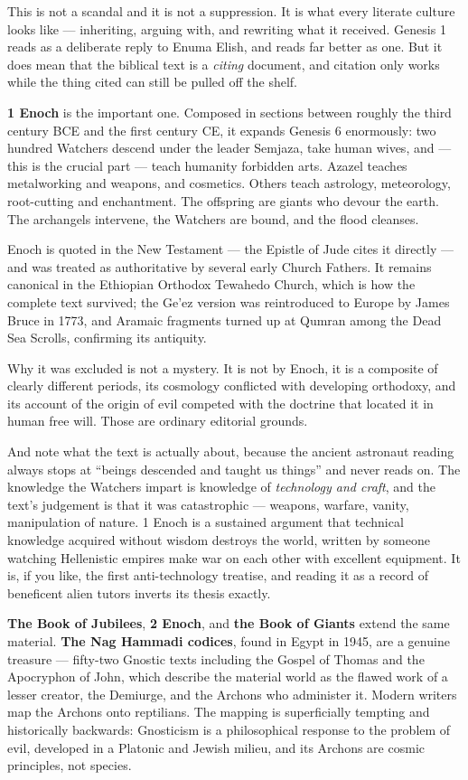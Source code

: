 This is not a scandal and it is not a suppression. It is what every literate culture looks
like --- inheriting, arguing with, and rewriting what it received. Genesis 1 reads as a
deliberate reply to Enuma Elish, and reads far better as one. But it does mean that the
biblical text is a \emph{citing} document, and citation only works while the thing cited can
still be pulled off the shelf.

\textbf{1 Enoch} is the important one. Composed in sections between roughly the third century
BCE and the first century CE, it expands Genesis 6 enormously: two hundred Watchers descend under
the leader Semjaza, take human wives, and --- this is the crucial part --- teach humanity
forbidden arts. Azazel teaches metalworking and weapons, and cosmetics. Others teach
astrology, meteorology, root-cutting and enchantment. The offspring are giants who devour the
earth. The archangels intervene, the Watchers are bound, and the flood cleanses.

Enoch is quoted in the New Testament --- the Epistle of Jude cites it directly --- and was
treated as authoritative by several early Church Fathers. It remains canonical in the Ethiopian
Orthodox Tewahedo Church, which is how the complete text survived; the Ge'ez version was
reintroduced to Europe by James Bruce in 1773, and Aramaic fragments turned up at Qumran among
the Dead Sea Scrolls, confirming its antiquity.

Why it was excluded is not a mystery. It is not by Enoch, it is a composite of clearly different
periods, its cosmology conflicted with developing orthodoxy, and its account of the origin of
evil competed with the doctrine that located it in human free will. Those are ordinary editorial
grounds.

And note what the text is actually about, because the ancient astronaut reading always stops at
``beings descended and taught us things'' and never reads on. The knowledge the Watchers impart
is knowledge of \emph{technology and craft}, and the text's judgement is that it was
catastrophic --- weapons, warfare, vanity, manipulation of nature. 1 Enoch is a sustained
argument that technical knowledge acquired without wisdom destroys the world, written by someone
watching Hellenistic empires make war on each other with excellent equipment. It is, if you
like, the first anti-technology treatise, and reading it as a record of beneficent alien tutors
inverts its thesis exactly.

\textbf{The Book of Jubilees}, \textbf{2 Enoch}, and \textbf{the Book of Giants} extend the same
material. \textbf{The Nag Hammadi codices}, found in Egypt in 1945, are a genuine treasure ---
fifty-two Gnostic texts including the Gospel of Thomas and the Apocryphon of John, which
describe the material world as the flawed work of a lesser creator, the Demiurge, and the
Archons who administer it. Modern writers map the Archons onto reptilians. The mapping is
superficially tempting and historically backwards: Gnosticism is a philosophical response to the
problem of evil, developed in a Platonic and Jewish milieu, and its Archons are cosmic
principles, not species.

